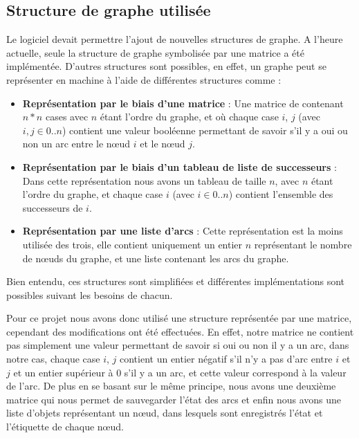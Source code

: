\documentclass[11pt,a4paper]{article}
\begin{document}
		\subsection{Structure de graphe utilisée}
			Le logiciel devait permettre l'ajout de nouvelles structures de graphe. A l'heure actuelle, seule la structure de graphe symbolisée par une matrice a été implémentée. D'autres structures sont possibles, en effet, un graphe peut se représenter en machine à l'aide de différentes structures comme : 
			\begin{itemize}
				\item \textbf{Représentation par le biais d'une matrice} : Une matrice de contenant $n * n$ cases avec $n$ étant l'ordre du graphe, et où chaque case $i$, $j$ (avec $i,j \in 0..n$) contient une valeur booléenne permettant de savoir s'il y a oui ou non un arc entre le n\oe ud $i$ et le n\oe ud $j$.
				\item \textbf{Représentation par le biais d'un tableau de liste de successeurs} : Dans cette représentation nous avons un tableau de taille $n$, avec $n$ étant l'ordre du graphe, et chaque case $i$ (avec $i \in 0..n$) contient l'ensemble des successeurs de $i$.
				\item \textbf{Représentation par une liste d'arcs} : Cette représentation est la moins utilisée des trois, elle contient uniquement un entier $n$ représentant le nombre de n\oe uds du graphe, et une liste contenant les arcs du graphe.
			\end{itemize}
			
			Bien entendu, ces structures sont simplifiées et différentes implémentations sont possibles suivant les besoins de chacun. 
			
			Pour ce projet nous avons donc utilisé une structure représentée par une matrice, cependant des modifications ont été effectuées. En effet, notre matrice ne contient pas simplement une valeur permettant de savoir si oui ou non il y a un arc, dans notre cas, chaque case $i$, $j$ contient un entier négatif s'il n'y a pas d'arc entre $i$ et $j$ et un entier supérieur à 0 s'il y a un arc, et cette valeur correspond à la valeur de l'arc. De plus en se basant sur le même principe, nous avons une deuxième matrice qui nous permet de sauvegarder l'état des arcs et enfin nous avons une liste d'objets représentant un n\oe ud, dans lesquels sont enregistrés l'état et l'étiquette de chaque n\oe ud. 
			
\end{document}
